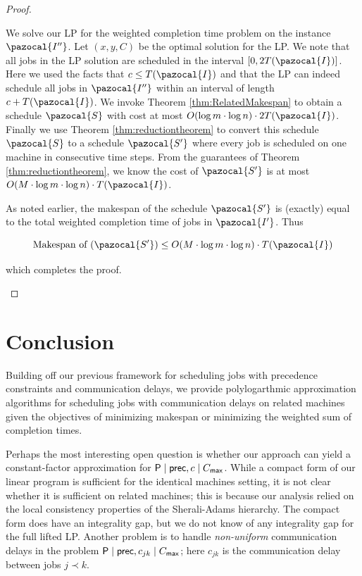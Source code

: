 \begin{proof}
\begin{itemize}
  We solve our LP for the weighted completion time problem on the instance $\pazocal{I''}$.
  Let $(x,y,C)$ be the optimal solution for the LP.
  We note that all jobs in the LP solution are scheduled in the interval $[0, 2T(\pazocal{I})]$.
  Here we used the facts that $c \leq T(\pazocal{I})$ and that the LP can indeed schedule all jobs in $\pazocal{I''}$ within an interval of length $c + T(\pazocal{I})$.
  We invoke Theorem \ref{thm:RelatedMakespan} to obtain a schedule $\pazocal{S}$ with  cost at most $O(\log m \cdot \log n) \cdot 2T(\pazocal{I})$.
  Finally we use Theorem \ref{thm:reductiontheorem} to convert this schedule $\pazocal{S}$ to a schedule  $\pazocal{S'}$ where every job is scheduled on one machine in consecutive time steps. From the guarantees of Theorem \ref{thm:reductiontheorem}, we know the cost of  $\pazocal{S'}$ is at most  $O(M \cdot \log m \cdot \log n) \cdot T(\pazocal{I})$.
  
  As noted earlier, the makespan of the schedule $\pazocal{S'}$ is (exactly) equal to the total weighted completion time of jobs in $\pazocal{I'}$. Thus
  
  $$
  \textrm{Makespan of $(\pazocal{S'})$}  \leq O(M \cdot \log m \cdot \log n ) \cdot T(\pazocal{I})
  $$
  
  which completes the proof.
  
  \end{itemize}
  
  \end{proof}
  
  \section{Conclusion}
  Building off our previous framework for scheduling jobs with precedence constraints and communication delays, 
  we provide polylogarthmic approximation algorithms for scheduling jobs with communication delays on related machines
  given the objectives of minimizing makespan or minimizing the weighted sum of completion times.

Perhaps the most interesting open question is whether our approach can yield a constant-factor approximation for $\mathsf{P} \mid \mathsf{prec}, c \mid C_{\mathsf{max}}$.
While a compact form of our linear program is sufficient for the identical machines setting, 
it is not clear whether it is sufficient on related machines; this is because our analysis relied on the local consistency properties of the Sherali-Adams
hierarchy. The compact form does have an integrality gap, but we do not know of any integrality gap for the full lifted LP.
 Another problem is to handle {\em non-uniform} communication delays in 
 the problem $\mathsf{P} \mid \mathsf{prec}, c_{jk} \mid C_{\mathsf{max}}$; here $c_{jk}$ is the communication delay between jobs $j \prec k$.
  
